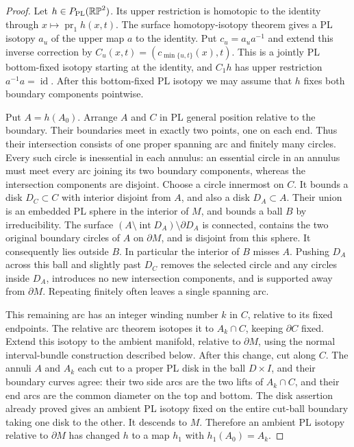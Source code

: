 \begin{proof}
Let $h\in P_{\rm PL}(\mathbb {RP}^2)$. Its upper restriction is
homotopic to the identity through
$x\mapsto\operatorname{pr}_1h(x,t)$. The surface homotopy-isotopy
theorem \cite[Theorem~6.3, p.~99]{Epstein1966} gives a PL isotopy
$a_u$ of the upper map $a$ to the identity. Put $c_u=a_ua^{-1}$
and extend this inverse correction by
$C_u(x,t)=(c_{\min\{u,t\}}(x),t)$. This is a jointly PL
bottom-fixed isotopy starting at the identity, and $C_1h$ has
upper restriction $a^{-1}a=\operatorname{id}$.
After this bottom-fixed PL isotopy we may assume that
$h$ fixes both boundary components pointwise.

Put $A=h(A_0)$. Arrange $A$ and $C$ in PL general position
relative to the boundary. Their boundaries meet in exactly two
points, one on each end. Thus their intersection consists of one
proper spanning arc and finitely many circles. Every such circle
is inessential in each annulus: an essential circle in an annulus
must meet every arc joining its two boundary components, whereas
the intersection components are disjoint. Choose a circle innermost
on $C$. It bounds a disk $D_C\subset C$ with interior disjoint
from $A$, and also a disk $D_A\subset A$. Their union is an
embedded PL sphere in the interior of $M$, and bounds a ball $B$
by irreducibility. The surface
$(A\setminus\operatorname{int}D_A)\setminus\partial D_A$ is
connected, contains the two original boundary circles of $A$ on
$\partial M$, and is disjoint from this sphere. It consequently
lies outside $B$. In particular the
interior of $B$ misses $A$. Pushing $D_A$ across this ball and
slightly past $D_C$ removes the selected circle and any circles
inside $D_A$, introduces no new intersection components, and is
supported away from $\partial M$. Repeating finitely often leaves
a single spanning arc.

This remaining arc has an integer winding number $k$ in $C$,
relative to its fixed endpoints. The relative arc theorem
\cite[Theorem~3.1, p.~89]{Epstein1966} isotopes it to
$A_k\cap C$, keeping $\partial C$ fixed. Extend this isotopy to
the ambient manifold, relative to $\partial M$, using the normal
interval-bundle construction described below. After this change,
cut along $C$. The annuli $A$ and $A_k$ each cut to a proper PL
disk in the ball $D\times I$, and their boundary curves agree:
their two side arcs are the two lifts of $A_k\cap C$, and their
end arcs are the common diameter on the top and bottom.
The disk assertion already proved gives an ambient PL isotopy
fixed on the entire cut-ball boundary taking one disk to the other.
It descends to $M$. Therefore an ambient PL isotopy relative to
$\partial M$ has changed $h$ to a map $h_1$ with
$h_1(A_0)=A_k$.


\end{proof}
